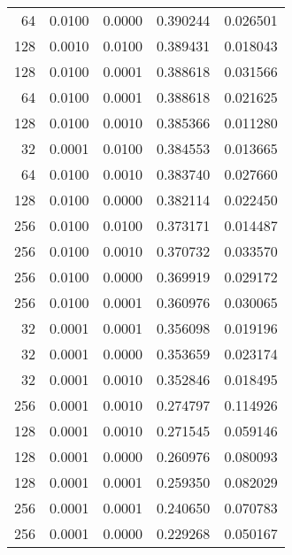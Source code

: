 \begin{tabular}{rrrrr}
  64 &  0.0100 &  0.0000 &  0.390244 &  0.026501 \\
 128 &  0.0010 &  0.0100 &  0.389431 &  0.018043 \\
 128 &  0.0100 &  0.0001 &  0.388618 &  0.031566 \\
  64 &  0.0100 &  0.0001 &  0.388618 &  0.021625 \\
 128 &  0.0100 &  0.0010 &  0.385366 &  0.011280 \\
  32 &  0.0001 &  0.0100 &  0.384553 &  0.013665 \\
  64 &  0.0100 &  0.0010 &  0.383740 &  0.027660 \\
 128 &  0.0100 &  0.0000 &  0.382114 &  0.022450 \\
 256 &  0.0100 &  0.0100 &  0.373171 &  0.014487 \\
 256 &  0.0100 &  0.0010 &  0.370732 &  0.033570 \\
 256 &  0.0100 &  0.0000 &  0.369919 &  0.029172 \\
 256 &  0.0100 &  0.0001 &  0.360976 &  0.030065 \\
  32 &  0.0001 &  0.0001 &  0.356098 &  0.019196 \\
  32 &  0.0001 &  0.0000 &  0.353659 &  0.023174 \\
  32 &  0.0001 &  0.0010 &  0.352846 &  0.018495 \\
 256 &  0.0001 &  0.0010 &  0.274797 &  0.114926 \\
 128 &  0.0001 &  0.0010 &  0.271545 &  0.059146 \\
 128 &  0.0001 &  0.0000 &  0.260976 &  0.080093 \\
 128 &  0.0001 &  0.0001 &  0.259350 &  0.082029 \\
 256 &  0.0001 &  0.0001 &  0.240650 &  0.070783 \\
 256 &  0.0001 &  0.0000 &  0.229268 &  0.050167 \\
\bottomrule
\end{tabular}
